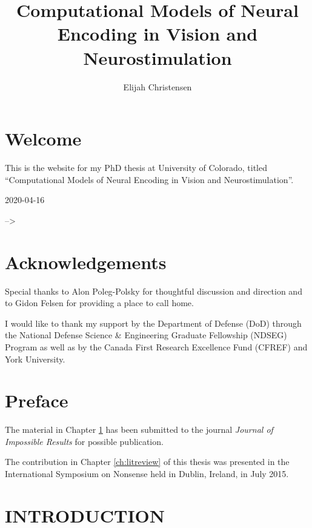 \documentclass{templates/ucdenverthesis}
\author{Elijah Christensen}
\title{Computational Models of Neural Encoding in Vision and Neurostimulation}
\begin{document}

\titlepage

{\sf\tighttoc\doublespacing}

\hypertarget{welcome}{%
\chapter*{Welcome}\label{welcome}}

This is the website for my PhD thesis at University of Colorado, titled ``Computational Models of Neural Encoding in Vision and Neurostimulation''.

2020-04-16

--\textgreater{}

\hypertarget{acknowledgements}{%
\chapter*{Acknowledgements}\label{acknowledgements}}

Special thanks to Alon Poleg-Polsky for thoughtful discussion and direction and to Gidon Felsen for providing a place to call home.

I would like to thank my support by the Department of Defense (DoD) through the National Defense Science \& Engineering Graduate Fellowship (NDSEG) Program as well as by the Canada First Research Excellence Fund (CFREF) and York University.

\hypertarget{preface}{%
\chapter*{Preface}\label{preface}}

The material in Chapter \ref{ch:intro} has been submitted to the journal \emph{Journal of Impossible Results} for possible publication.

The contribution in Chapter \ref{ch:litreview} of this thesis was presented in the International Symposium on Nonsense held in Dublin, Ireland, in July 2015.

\clearpage{}\setcounter{page}{0}

\hypertarget{ch:intro}{%
\chapter{INTRODUCTION}\label{ch:intro}}
\end{document}
